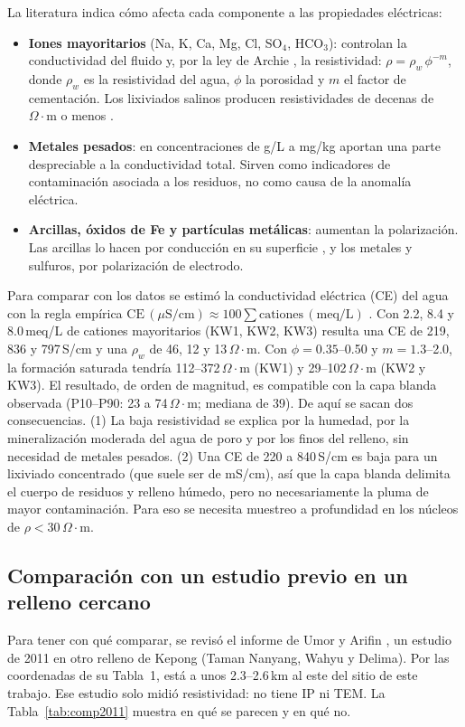 \documentclass[conference]{IEEEtran}
\newcommand{\ohmm}{\ensuremath{\Omega\!\cdot\!\mathrm{m}}}
\begin{document}
La literatura indica cómo afecta cada componente a las propiedades eléctricas:
\begin{itemize}
\item \textbf{Iones mayoritarios} (Na, K, Ca, Mg, Cl, SO$_4$, HCO$_3$): controlan la conductividad del fluido y, por la ley de Archie \cite{archie1942}, la resistividad: $\rho=\rho_w\,\phi^{-m}$, donde $\rho_w$ es la resistividad del agua, $\phi$ la porosidad y $m$ el factor de cementación. Los lixiviados salinos producen resistividades de decenas de \ohmm{} o menos \cite{aristodemou2000,mepaiyeda2019}.
\item \textbf{Metales pesados}: en concentraciones de \textmu g/L a mg/kg aportan una parte despreciable a la conductividad total. Sirven como indicadores de contaminación asociada a los residuos, no como causa de la anomalía eléctrica.
\item \textbf{Arcillas, óxidos de Fe y partículas metálicas}: aumentan la polarización. Las arcillas lo hacen por conducción en su superficie \cite{slater2002,gazoty2012}, y los metales y sulfuros, por polarización de electrodo.
\end{itemize}

Para comparar con los datos se estimó la conductividad eléctrica (CE) del agua con la regla empírica $\mathrm{CE}\,(\mu\mathrm{S/cm})\approx100\sum\text{cationes}\,(\mathrm{meq/L})$ \cite{hem1985}. Con 2.2, 8.4 y 8.0\,meq/L de cationes mayoritarios (KW1, KW2, KW3) resulta una CE de 219, 836 y 797\,\textmu S/cm y una $\rho_w$ de 46, 12 y 13\,\ohmm. Con $\phi=0.35$--0.50 y $m=1.3$--2.0, la formación saturada tendría 112--372\,\ohmm{} (KW1) y 29--102\,\ohmm{} (KW2 y KW3). El resultado, de orden de magnitud, es compatible con la capa blanda observada (P10--P90: 23 a 74\,\ohmm; mediana de 39). De aquí se sacan dos consecuencias. (1) La baja resistividad se explica por la humedad, por la mineralización moderada del agua de poro y por los finos del relleno, sin necesidad de metales pesados. (2) Una CE de 220 a 840\,\textmu S/cm es baja para un lixiviado concentrado (que suele ser de mS/cm), así que la capa blanda delimita el cuerpo de residuos y relleno húmedo, pero no necesariamente la pluma de mayor contaminación. Para eso se necesita muestreo a profundidad en los núcleos de $\rho<30$\,\ohmm.

\subsection{Comparación con un estudio previo en un relleno cercano}
Para tener con qué comparar, se revisó el informe de Umor y Arifin \cite{umor2011}, un estudio de 2011 en otro relleno de Kepong (Taman Nanyang, Wahyu y Delima). Por las coordenadas de su Tabla~1, está a unos 2.3--2.6\,km al este del sitio de este trabajo. Ese estudio solo midió resistividad: no tiene IP ni TEM. La Tabla~\ref{tab:comp2011} muestra en qué se parecen y en qué no.
\end{document}
